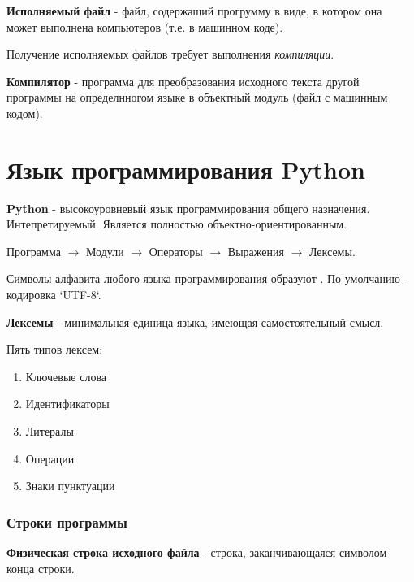 \begin{definition}
  \textbf{Исполняемый файл} - файл, содержащий прогрумму в виде, в котором она может выполнена компьютеров (т.е. в машинном коде).
\end{definition}

Получение исполняемых файлов требует выполнения \textit{компиляции}.

\begin{definition}
  \textbf{Компилятор} - программа для преобразования исходного текста другой программы на определнногом языке в объектный модуль (файл с машинным кодом).
\end{definition}

\section{Язык программирования Python}

\begin{definition}
  \textbf{Python} - высокоуровневый язык программирования общего назначения. Интепретируемый. Является полностью объектно-ориентированным.
\end{definition}

Программа $\to $ Модули $\to $ Операторы $\to $ Выражения $\to $ Лексемы.

\begin{definition}
  Символы алфавита любого языка программирования образуют . По умолчанию - кодировка `UTF-8`.
\end{definition}

\begin{definition}
  \textbf{Лексемы} - минимальная единица языка, имеющая самостоятельный смысл.
\end{definition}

Пять типов лексем:
\begin{enumerate} 
  \item Ключевые слова
  \item Идентификаторы
  \item Литералы
  \item Операции
  \item Знаки пунктуации
\end{enumerate}

\subsubsection*{Строки программы}

\textbf{Физическая строка исходного файла} - строка, заканчивающаяся символом конца строки.

